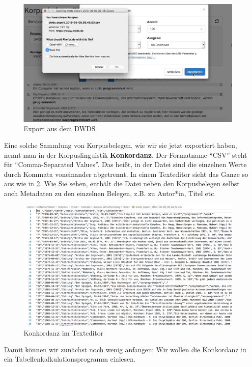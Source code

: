 \documentclass[]{article}
\begin{document}
\begin{figure}
\includegraphics[width=5.37in]{fig/dwdsdownload} \caption{Export aus dem DWDS}\label{fig:dwdsexp}
\end{figure}

Eine solche Sammlung von Korpusbelegen, wie wir sie jetzt exportiert
haben, nennt man in der Korpuslinguistik \textbf{Konkordanz}. Der
Formatname ``CSV'' steht für ``Comma-Separated Values''. Das heißt, in
der Datei sind die einzelnen Werte durch Kommata voneinander abgetrennt.
In einem Texteditor sieht das Ganze so aus wie in \ref{fig:dwdseditor}.
Wie Sie sehen, enthält die Datei neben den Korpusbelegen selbst auch
Metadaten zu den einzelnen Belegen, z.B. zu Autor*in, Titel etc.

\begin{figure}
\includegraphics[width=4.86in]{fig/conc_in_editor} \caption{Konkordanz im Texteditor}\label{fig:dwdseditor}
\end{figure}

Damit können wir zunächst noch wenig anfangen: Wir wollen die Konkordanz
in ein Tabellenkalkulationsprogramm einlesen.
\end{document}
